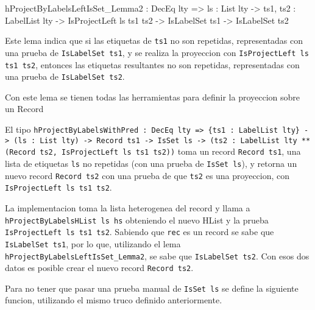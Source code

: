 \begin{code}
hProjectByLabelsLeftIsSet_Lemma2 : DecEq lty => 
  {ls : List lty} -> {ts1, ts2 : LabelList lty} -> 
  IsProjectLeft ls ts1 ts2 -> IsLabelSet ts1 -> 
  IsLabelSet ts2
\end{code}

Este lema indica que si las etiquetas de \texttt{ts1} no son repetidas, representadas con una prueba de \texttt{IsLabelSet ts1}, y se realiza la proyeccion con \texttt{IsProjectLeft ls ts1 ts2}, entonces las etiquetas resultantes no son repetidas, representadas con una prueba de \texttt{IsLabelSet ts2}.

Con este lema se tienen todas las herramientas para definir la proyeccion sobre un Record


El tipo \texttt{hProjectByLabelsWithPred : DecEq lty => \{ts1 : LabelList lty\} -> (ls : List lty) -> Record ts1 -> IsSet ls -> (ts2 : LabelList lty ** (Record ts2, IsProjectLeft ls ts1 ts2))} toma un record \texttt{Record ts1}, una lista de etiquetas \texttt{ls} no repetidas (con una prueba de \texttt{IsSet ls}), y retorna un nuevo record \texttt{Record ts2} con una prueba de que \texttt{ts2} es una proyeccion, con \texttt{IsProjectLeft ls ts1 ts2}.

La implementacion toma la lista heterogenea del record y llama a \texttt{hProjectByLabelsHList ls hs} obteniendo el nuevo HList y la prueba \texttt{IsProjectLeft ls ts1 ts2}. Sabiendo que \texttt{rec} es un record se sabe que \texttt{IsLabelSet ts1}, por lo que, utilizando el lema \texttt{hProjectByLabelsLeftIsSet\_Lemma2}, se sabe que \texttt{IsLabelSet ts2}. Con esos dos datos es posible crear el nuevo record \texttt{Record ts2}.

Para no tener que pasar una prueba manual de \texttt{IsSet ls} se define la siguiente funcion, utilizando el mismo truco definido anteriormente.

